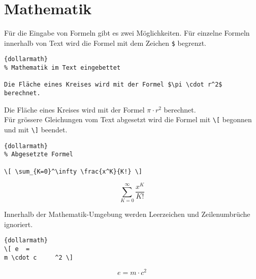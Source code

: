 \section{Mathematik}

\indent
Für die Eingabe von Formeln gibt es zwei Möglichkeiten. Für einzelne Formeln 
innerhalb von Text wird die Formel mit dem Zeichen \verb?$? begrenzt. 
\begin{center}
\begin{lstlisting}[caption=Mathe im Text]{dollarmath}
% Mathematik im Text eingebettet

Die Fläche eines Kreises wird mit der Formel $\pi \cdot r^2$ berechnet. 
\end{lstlisting}
\end{center}
Die Fläche eines Kreises wird mit der Formel $\pi \cdot r^2$ berechnet. \\

Für grössere Gleichungen vom Text abgesetzt wird die Formel mit \verb?\[? 
begonnen und mit \verb?\]? beendet. 
\begin{center}
\begin{lstlisting}[caption=Mathe abgesetzt]{dollarmath}
% Abgesetzte Formel

\[ \sum_{K=0}^\infty \frac{x^K}{K!} \]
\end{lstlisting}
\end{center}
\[ \sum_{K=0}^\infty \frac{x^K}{K!} \]

Innerhalb der Mathematik-Umgebung werden Leerzeichen und Zeilenumbrüche ignoriert. 
\begin{center}
\begin{lstlisting}[caption=Mathe abgesetzt]{dollarmath}
\[ e  = 
m \cdot c     ^2 \]
\end{lstlisting}
\end{center}
\[ e  = 
m \cdot c     ^2 \]
